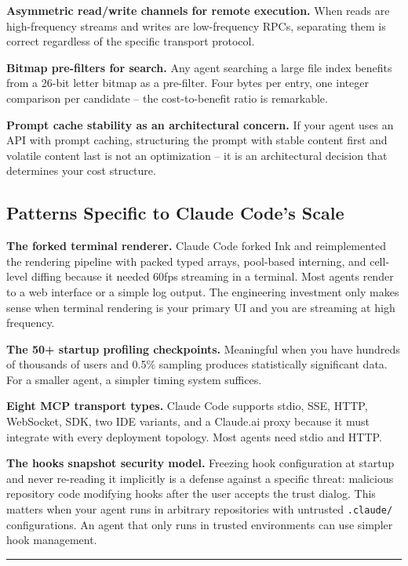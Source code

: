 \documentclass[
  english,
  11pt,
  letterpaper,
]{book}
\begin{document}
\textbf{Asymmetric read/write channels for remote execution.} When reads
are high-frequency streams and writes are low-frequency RPCs, separating
them is correct regardless of the specific transport protocol.

\textbf{Bitmap pre-filters for search.} Any agent searching a large file
index benefits from a 26-bit letter bitmap as a pre-filter. Four bytes
per entry, one integer comparison per candidate -- the cost-to-benefit
ratio is remarkable.

\textbf{Prompt cache stability as an architectural concern.} If your
agent uses an API with prompt caching, structuring the prompt with
stable content first and volatile content last is not an optimization --
it is an architectural decision that determines your cost structure.

\subsection{Patterns Specific to Claude Code's
Scale}\label{patterns-specific-to-claude-codes-scale}

\textbf{The forked terminal renderer.} Claude Code forked Ink and
reimplemented the rendering pipeline with packed typed arrays,
pool-based interning, and cell-level diffing because it needed 60fps
streaming in a terminal. Most agents render to a web interface or a
simple log output. The engineering investment only makes sense when
terminal rendering is your primary UI and you are streaming at high
frequency.

\textbf{The 50+ startup profiling checkpoints.} Meaningful when you have
hundreds of thousands of users and 0.5\% sampling produces statistically
significant data. For a smaller agent, a simpler timing system suffices.

\textbf{Eight MCP transport types.} Claude Code supports stdio, SSE,
HTTP, WebSocket, SDK, two IDE variants, and a Claude.ai proxy because it
must integrate with every deployment topology. Most agents need stdio
and HTTP.

\textbf{The hooks snapshot security model.} Freezing hook configuration
at startup and never re-reading it implicitly is a defense against a
specific threat: malicious repository code modifying hooks after the
user accepts the trust dialog. This matters when your agent runs in
arbitrary repositories with untrusted \texttt{.claude/} configurations.
An agent that only runs in trusted environments can use simpler hook
management.

\begin{center}\rule{0.5\linewidth}{0.5pt}\end{center}
\end{document}
